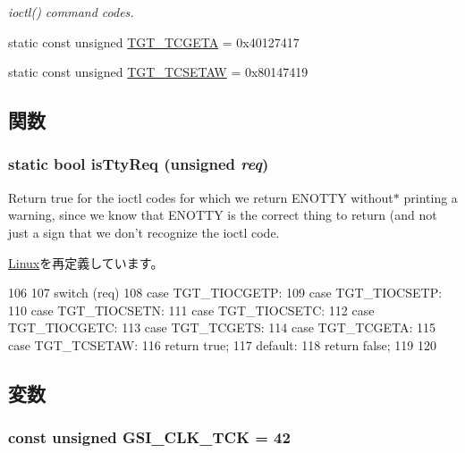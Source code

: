 \begin{Indent}{\bf }
\begin{DoxyCompactItemize}
\begin{DoxyCompactList}\small\item\em ioctl() command codes. \item\end{DoxyCompactList}\item 
static const unsigned \hyperlink{classAlphaLinux_a804fc265279c5dbd78e0f95da998b267}{TGT\_\-TCGETA} = 0x40127417
\item 
static const unsigned \hyperlink{classAlphaLinux_a96e06e042526ea5e89c4e8a020636c52}{TGT\_\-TCSETAW} = 0x80147419
\end{DoxyCompactItemize}
\end{Indent}


\subsection{関数}
\hypertarget{classAlphaLinux_ab20bdd4422ecf6e1736a5587be296b3f}{
\subsubsection[{isTtyReq}]{\setlength{\rightskip}{0pt plus 5cm}static bool isTtyReq (unsigned {\em req})}}
\label{classAlphaLinux_ab20bdd4422ecf6e1736a5587be296b3f}
Return true for the ioctl codes for which we return ENOTTY without$\ast$ printing a warning, since we know that ENOTTY is the correct thing to return (and not just a sign that we don't recognize the ioctl code. 

\hyperlink{classLinux_ab20bdd4422ecf6e1736a5587be296b3f}{Linux}を再定義しています。


\begin{DoxyCode}
106     {
107         switch (req) {
108           case TGT_TIOCGETP:
109           case TGT_TIOCSETP:
110           case TGT_TIOCSETN:
111           case TGT_TIOCSETC:
112           case TGT_TIOCGETC:
113           case TGT_TCGETS:
114           case TGT_TCGETA:
115           case TGT_TCSETAW:
116             return true;
117           default:
118             return false;
119         }
120     }
\end{DoxyCode}


\subsection{変数}
\hypertarget{classAlphaLinux_a26c255cf18ca324c7c09a629e9e2a4f0}{
\subsubsection[{GSI\_\-CLK\_\-TCK}]{\setlength{\rightskip}{0pt plus 5cm}const unsigned {\bf GSI\_\-CLK\_\-TCK} = 42}}
\label{classAlphaLinux_a26c255cf18ca324c7c09a629e9e2a4f0}


